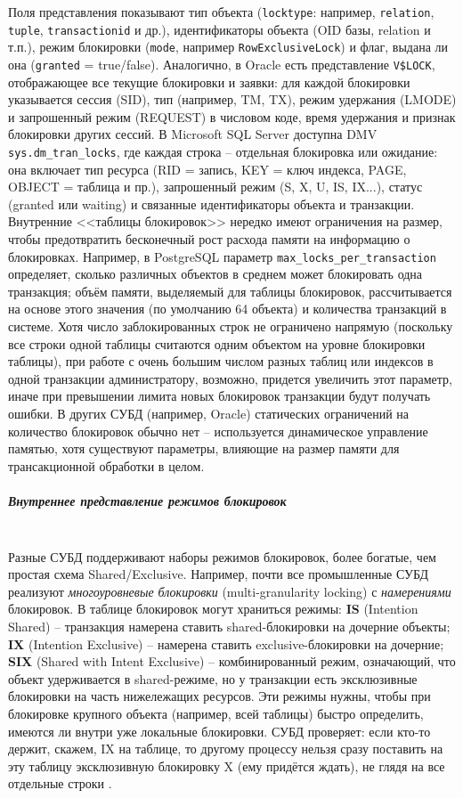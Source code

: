  Поля представления показывают тип объекта (\texttt{locktype}: например, \texttt{relation}, \texttt{tuple}, \texttt{transactionid} и др.), идентификаторы объекта (OID базы, relation и т.п.), режим блокировки (\texttt{mode}, например \texttt{RowExclusiveLock}) и флаг, выдана ли она (\texttt{granted} = true/false). Аналогично, в Oracle есть представление \texttt{V\$LOCK}, отображающее все текущие блокировки и заявки: для каждой блокировки указывается сессия (SID), тип (например, TM, TX), режим удержания (LMODE) и запрошенный режим (REQUEST) в числовом коде, время удержания и признак блокировки других сессий. В Microsoft SQL Server доступна DMV \texttt{sys.dm\_tran\_locks}, где каждая строка – отдельная блокировка или ожидание: она включает тип ресурса (RID = запись, KEY = ключ индекса, PAGE, OBJECT = таблица и пр.), запрошенный режим (S, X, U, IS, IX...), статус (granted или waiting) и связанные идентификаторы объекта и транзакции. Внутренние <<таблицы блокировок>> нередко имеют ограничения на размер, чтобы предотвратить бесконечный рост расхода памяти на информацию о блокировках. Например, в PostgreSQL параметр \texttt{max\_locks\_per\_transaction} определяет, сколько различных объектов в среднем может блокировать одна транзакция; объём памяти, выделяемый для таблицы блокировок, рассчитывается на основе этого значения (по умолчанию 64 объекта) и количества транзакций в системе. Хотя число заблокированных строк не ограничено напрямую (поскольку все строки одной таблицы считаются одним объектом на уровне блокировки таблицы), при работе с очень большим числом разных таблиц или индексов в одной транзакции администратору, возможно, придется увеличить этот параметр, иначе при превышении лимита новых блокировок транзакции будут получать ошибки. В других СУБД (например, Oracle) статических ограничений на количество блокировок обычно нет – используется динамическое управление памятью, хотя существуют параметры, влияющие на размер памяти для трансакционной обработки в целом. 
 
 \subparagraph{Внутреннее представление режимов блокировок} ~\\

Разные СУБД поддерживают наборы режимов блокировок, более богатые, чем простая схема Shared/Exclusive. Например, почти все промышленные СУБД реализуют \textit{многоуровневые блокировки} (multi-granularity locking) с \textit{намерениями} блокировок. В таблице блокировок могут храниться режимы: \textbf{IS} (Intention Shared) – транзакция намерена ставить shared-блокировки на дочерние объекты; \textbf{IX} (Intention Exclusive) – намерена ставить exclusive-блокировки на дочерние; \textbf{SIX} (Shared with Intent Exclusive) – комбинированный режим, означающий, что объект удерживается в shared-режиме, но у транзакции есть эксклюзивные блокировки на часть нижележащих ресурсов. Эти режимы нужны, чтобы при блокировке крупного объекта (например, всей таблицы) быстро определить, имеются ли внутри уже локальные блокировки. СУБД проверяет: если кто-то держит, скажем, IX на таблице, то другому процессу нельзя сразу поставить на эту таблицу эксклюзивную блокировку X (ему придётся ждать), не глядя на все отдельные строки \autocite{sqlhack1}. 
 
